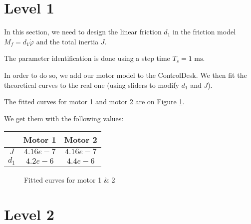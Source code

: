 \section*{Level 1}



In this section, we need to design the linear friction $d_1$ in the friction model $M_f = d_1 \dot{\varphi}$ and the total inertia $J$.

The parameter identification is done using a step time $T_s = 1 \text{ ms}$.

In order to do so, we add our motor model to the ControlDesk. We then fit the theoretical curves to the real one (using sliders to modify $d_1$ and $J$). 

The fitted curves for motor 1 and motor 2 are on Figure \ref{fittedCurves}.

We get them with the following values:

\begin{center}
\begin{tabular}{|c|c|c|}
 \hline
 & Motor 1 & Motor 2 \\
 \hline 
 $J$ & $4.16e-7$ & $4.16e-7$ \\ 
 \hline 
 $d_1$ & $4.2e-6$ & $4.4e-6$  \\
 \hline
\end{tabular}
\end{center}



\begin{figure}[ht]
 \caption{Fitted curves for motor 1 \& 2}
 \label{fittedCurves}
\end{figure}




\section*{Level 2}